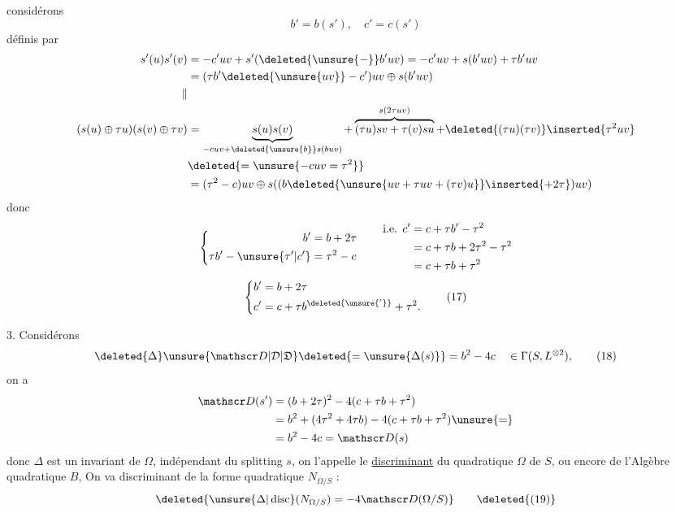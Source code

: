 considérons
\[
b'=b(s'),\quad c'=c(s')
\]
définis par
\[
\begin{aligned}
s'(u)s'(v)&=-c'uv+s'(\deleted{\unsure{-}}b'uv)=-c'uv+s(b'uv)+\tau b'uv\\
&=(\tau b'\deleted{\unsure{uv}}-c')uv\oplus s(b'uv)\\
\Vert&\\
(s(u)\oplus\tau u)(s(v)\oplus\tau v)
 &=\underbrace{s(u)s(v)}_{-cuv+\deleted{\unsure{b}}s(buv)}+
 \overbrace{(\tau u)sv+\tau(v)su}^{s(2\tau uv)}
 +\deleted{(\tau u)(\tau v)}\inserted{\tau^2uv}\\
 &\deleted{=\unsure{-cuv=\tau^2}}\\
 &=(\tau^2-c)uv\oplus s((b\deleted{\unsure{uv+\tau u v+(\tau v)u}}\inserted{+2\tau})uv)
\end{aligned}
\]
donc
\[
\left\{\begin{aligned}b'&=b+2\tau\\
\tau b'-\unsure{\tau'|c'}&=\tau^2-c
\end{aligned}\right.
\qquad\begin{aligned}
\text{i.e. }c'&=c+\tau b'-\tau^2\\
 &=c+\tau b+2\tau^2-\tau^2\\
 &=c+\tau b+\tau^2
\end{aligned}
\]
\[
\left\{\begin{aligned}b'&=b+2\tau\\
c'&=c+\tau b^{\deleted{\unsure{'}}}+\tau^2 .
\end{aligned}\right. \tag*{(17)}
\]

3. Considérons
\[
\deleted{\Delta}\unsure{\mathscr D|\mathcal D|\mathfrak D}\deleted{=\unsure{\Delta(s)}}=b^2-4c\quad\in\Gamma(S,L^{\otimes2}),\tag*{(18)}
\]
on a 
\[
\begin{aligned}
\mathscr D(s')&=(b+2\tau)^2-4(c+\tau b+\tau^2)\\
 &=b^2+(4\tau^2+4\tau b)-4(c+\tau b+\tau^2)\unsure{=}\\
 &=b^2-4c=\mathscr D(s)
\end{aligned}
\]
donc $\Delta$ est un invariant de $\Omega$, indépendant
du splitting $s$, on l'appelle le \uline{discriminant} du
 quadratique $\Omega$ de $S$, ou encore de l'Algèbre
quadratique $B$,  On va 
 discriminant de la forme
quadratique $N_{\Omega/S}$ :
\[
\deleted{\unsure{\Delta|\operatorname{disc}}(N_{\Omega/S})=-4\mathscr D(\Omega/S)} \tag*{\deleted{(19)}}
\]

